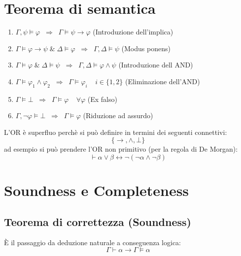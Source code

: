 \documentclass{article}
\theoremstyle{break}
\theoremstyle{break}
\theoremstyle{break}
\theoremstyle{break}
\begin{document}
\section{Teorema di semantica}
    \begin{enumerate}
        \item \( \Gamma,\psi \models \varphi\;\; \Rightarrow\;\; \Gamma \models \psi \to \varphi \) (Introduzione dell'implica)
        \item \( \Gamma \models \varphi \to \psi \;\&\; \Delta \models \varphi \;\;\Rightarrow\;\; \Gamma,\Delta \models \psi \) (Modus ponens)
        \item \( \Gamma \models \varphi \;\&\; \Delta \models \psi \;\;\Rightarrow\;\; \Gamma,\Delta \models \varphi \wedge \psi \) (Introduzione dell AND)
        \item \( \Gamma \models \varphi_1 \wedge \varphi_2 \;\;\Rightarrow\;\; \Gamma \models \varphi_i \;\;\;\; i \in \{1,2\}  \) (Eliminazione dell'AND)
        \item \( \Gamma \models \bot \;\;\Rightarrow\;\; \Gamma \models \varphi \;\;\;\; \forall \varphi \) (Ex falso)
        \item \( \Gamma, \neg \varphi \models \bot \;\;\Rightarrow\;\; \Gamma \models \varphi \) (Riduzione ad assurdo)
    \end{enumerate}
    L'OR è superfluo perchè si può definire in termini dei seguenti connettivi:
    \[
        \{\to , \wedge, \bot\} 
    \] 
    ad esempio si può prendere l'OR non primitivo (per la regola di De Morgan): \[ \vdash \alpha \vee \beta \leftrightarrow \neg(\neg \alpha \wedge \neg \beta) \] 

\section{Soundness e Completeness}
\subsection{Teorema di correttezza (Soundness)}
È il passaggio da deduzione naturale a conseguenza logica:
\[
    \Gamma \vdash \alpha \to \Gamma \models \alpha
\] 
\end{document}
